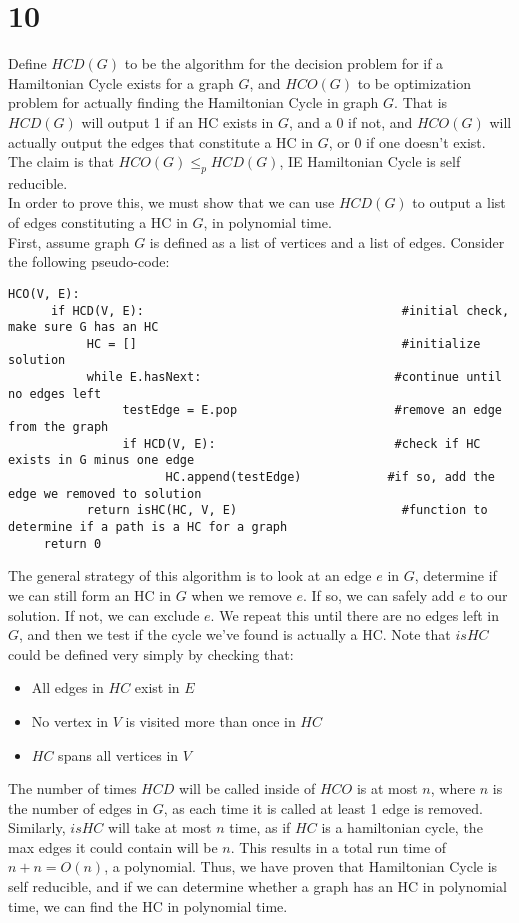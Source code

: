 \documentclass[letterpaper,notitlepage,twoside]{article}
\begin{document}
\section*{10}
Define $HCD(G)$ to be the algorithm for the decision problem for if a Hamiltonian Cycle exists for a graph $G$, and $HCO(G)$ to be optimization problem for actually finding the Hamiltonian Cycle in graph $G$. That is $HCD(G)$ will output 1 if an HC exists in $G$, and a 0 if not, and $HCO(G)$ will actually output the edges that constitute a HC in $G$, or 0 if one doesn't exist. The claim is that $HCO(G) \leq_p HCD(G)$, IE Hamiltonian Cycle is self reducible. \\
In order to prove this, we must show that we can use $HCD(G)$ to output a list of edges constituting a HC in $G$, in polynomial time. \\
First, assume graph $G$ is defined as a list of vertices and a list of edges. Consider the following pseudo-code: 
\begin{verbatim}
HCO(V, E):
      if HCD(V, E):                                    #initial check, make sure G has an HC
           HC = []                                     #initialize solution 
           while E.hasNext:                           #continue until no edges left 
                testEdge = E.pop                      #remove an edge from the graph
                if HCD(V, E):                         #check if HC exists in G minus one edge
                      HC.append(testEdge)            #if so, add the edge we removed to solution
           return isHC(HC, V, E)                       #function to determine if a path is a HC for a graph
     return 0

\end{verbatim}
The general strategy of this algorithm is to look at an edge $e$ in $G$, determine if we can still form an HC in $G$ when we remove $e$. If so, we can safely add $e$ to our solution. If not, we can exclude $e$. We repeat this until there are no edges left in $G$, and then we test if the cycle we've found is actually a HC. Note that $isHC$ could be defined very simply by checking that:
\begin{itemize}
\item All edges in $HC$ exist in $E$
\item No vertex in $V$ is visited more than once in $HC$
\item $HC$ spans all vertices in $V$
\end{itemize}
The number of times $HCD$ will be called inside of $HCO$ is at most $n$, where $n$ is the number of edges in $G$, as each time it is called at least 1 edge is removed. Similarly, $isHC$ will take at most $n$ time, as if $HC$ is a hamiltonian cycle, the max edges it could contain will be $n$. This results in a total run time of $n + n = O(n)$, a polynomial. Thus, we have proven that Hamiltonian Cycle is self reducible, and if we can determine whether a graph has an HC in polynomial time, we can find the HC in polynomial time.  
\end{document}

